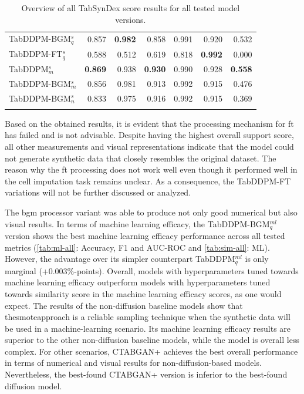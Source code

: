 \begin{table}[h]
\begin{tabular}{lrrrrrr}
		TabDDPM-BGM$^{s}_q$   & 0.857                     & \textbf{0.982} & 0.858                & 0.991          & 0.920            & 0.532          \\
		TabDDPM-FT$^{s}_q$    & 0.588                     & 0.512          & 0.619                & 0.818          & \textbf{0.992}   & 0.000          \\
		TabDDPM$^{s}_m$       & \textbf{0.869}            & 0.938          & \textbf{0.930}       & 0.990          & 0.928            & \textbf{0.558} \\
		TabDDPM-BGM$^{s}_m$   & 0.856                     & 0.981          & 0.913                & 0.992          & 0.915            & 0.476          \\
		TabDDPM-BGM$^{s}_{n}$ & 0.833                     & 0.975          & 0.916                & 0.992          & 0.915            & 0.369          \\
		\bottomrule
		\multicolumn{7}{c}{}\\[-0.6em]
	\end{tabular}
	\caption[Overview all TabSynDex results]{Overview of all TabSynDex score results for all tested model versions.}
	\label{tab:sim-all}
\end{table}


Based on the obtained results, it is evident that the processing mechanism for \gls{ft} has failed and is not advisable.
Despite having the highest overall support score, all other measurements and visual representations indicate that the model could not generate synthetic data that closely resembles the original dataset.
The reason why the \gls{ft} processing does not work well even though it performed well in the cell imputation task \cite{zheng2022DiffusionModelsMissing} remains unclear.
As a consequence, the TabDDPM-FT variations will not be further discussed or analyzed.

The \gls{bgm} processor variant was able to produce not only good numerical but also visual results.
In terms of machine learning efficacy, the TabDDPM-BGM$^{ml}_q$ version shows the best machine learning efficacy performance across all tested metrics (\autoref{tab:ml-all}: Accuracy, F1 and AUC-ROC and \autoref{tab:sim-all}: ML).
However, the advantage over its simpler counterpart TabDDPM$^{ml}_q$ is only marginal (+0.003\%-points).
Overall, models with hyperparameters tuned towards machine learning efficacy outperform models with hyperparameters tuned towards similarity score in the machine learning efficacy scores, as one would expect.
The results of the non-diffusion baseline models show that the\gls{smote}approach is a reliable sampling technique when the synthetic data will be used in a machine-learning scenario.
Its machine learning efficacy results are superior to the other non-diffusion baseline models, while the model is overall less complex.
For other scenarios, CTABGAN+ achieves the best overall performance in terms of numerical and visual results for non-diffusion-based models.
Nevertheless, the best-found CTABGAN+ version is inferior to the best-found diffusion model.

